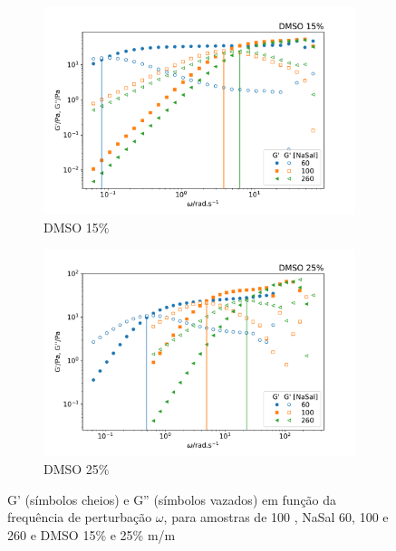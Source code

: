 	\begin{figure}[h]
		\begin{subfigure}[t]{0.5\textwidth}
			\centering
			\includegraphics[width=\textwidth]{imagens/reologia/oscilatorio_dmso15p}
			\caption{DMSO 15\%}
			\label{fig:oscilatorio_dmso_15p}
		\end{subfigure} %
		\begin{subfigure}[t]{0.5\textwidth}
			\centering
			\includegraphics[width=\textwidth]{imagens/reologia/oscilatorio_dmso25p}
			\caption{DMSO 25\%}
			\label{fig:oscilatorio_dmso_25p}
		\end{subfigure} %
		\caption{G' (símbolos cheios) e G'' (símbolos vazados) em função da frequência de perturbação \(\omega\), para amostras de \CTAB{} 100 \mM{}, NaSal 60, 100 e 260 \mM{} e DMSO 15\% e 25\% m/m}
		\label{fig:oscilatorio_dmso}
	\end{figure} 	
	
